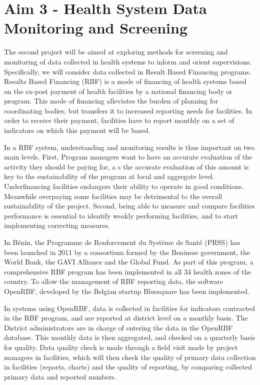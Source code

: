 \section[Data Monitoring]{Aim 3 - Health System Data Monitoring and Screening}

The second project will be aimed at exploring methods for screening and monitoring of data collected in health systems to inform and orient supervisions. Specifically, we will consider data collected in Result Based Financing programs. Results Based Financing (RBF) is a mode of financing of health systems based on the ex-post payment of health facilities by a national financing body or program. This mode of financing alleviates the burden of planning for coordinating bodies, but transfers it to increased reporting needs for facilities. In order to receive their payment, facilities have to report monthly on a set of indicators on which this payment will be based.

In a RBF system, understanding and monitoring results is thus important on two main levels. First, Program managers want to have an accurate evaluation of the activity they should be paying for, a	s the accurate evaluation of this amount is key to the sustainability of the program at local and aggregate level. Underfinancing facilities endangers their ability to operate in good conditions. Meanwhile overpaying some facilities may be detrimental to the overall sustainability of the project. Second, being able to measure and compare facilities performance is essential to identify weakly performing facilities, and to start implementing correcting measures.

In Bénin, the Programme de Renforcement du Système de Santé (PRSS) has been launched in 2011 by a consortium formed by the Beninese government, the World Bank, the GAVI Alliance and the Global Fund. As part of this program, a comprehensive RBF program has been implemented in all 34 health zones of the country. To allow the management of RBF reporting data, the software OpenRBF, developed by the Belgian startup Bluesquare has been implemented.

In systems using OpenRBF, data is collected in facilities for indicators contracted in the RBF program, and are reported at district level on a monthly basis. The District administrators are in charge of entering the data in the OpenRBF database. This monthly data is then aggregated, and checked on a quarterly basis for quality. Data quality check is made through a field visit made by project managers in facilities, which will then check the quality of primary data collection in facilities (reports, charts) and the quality of reporting, by comparing collected primary data and reported numbers.


